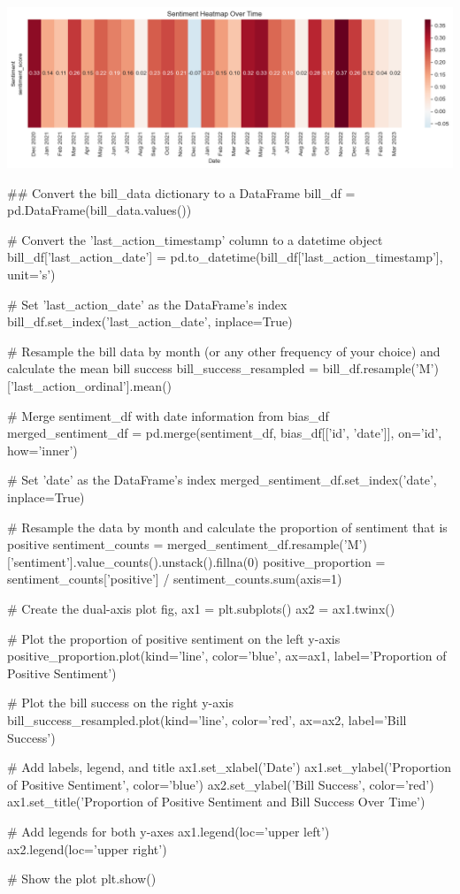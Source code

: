 \includegraphics[width=\textwidth]{./figs/fig_8.png}
\begin{pyin}
\## Convert the bill_data dictionary to a DataFrame
bill_df = pd.DataFrame(bill_data.values())

# Convert the 'last_action_timestamp' column to a datetime object
bill_df['last_action_date'] = pd.to_datetime(bill_df['last_action_timestamp'], unit='s')

# Set 'last_action_date' as the DataFrame's index
bill_df.set_index('last_action_date', inplace=True)

# Resample the bill data by month (or any other frequency of your choice) and calculate the mean bill success
bill_success_resampled = bill_df.resample('M')['last_action_ordinal'].mean()

# Merge sentiment_df with date information from bias_df
merged_sentiment_df = pd.merge(sentiment_df, bias_df[['id', 'date']], on='id', how='inner')

# Set 'date' as the DataFrame's index
merged_sentiment_df.set_index('date', inplace=True)

# Resample the data by month and calculate the proportion of sentiment that is positive
sentiment_counts = merged_sentiment_df.resample('M')['sentiment'].value_counts().unstack().fillna(0)
positive_proportion = sentiment_counts['positive'] / sentiment_counts.sum(axis=1)

# Create the dual-axis plot
fig, ax1 = plt.subplots()
ax2 = ax1.twinx()

# Plot the proportion of positive sentiment on the left y-axis
positive_proportion.plot(kind='line', color='blue', ax=ax1, label='Proportion of Positive Sentiment')

# Plot the bill success on the right y-axis
bill_success_resampled.plot(kind='line', color='red', ax=ax2, label='Bill Success')

# Add labels, legend, and title
ax1.set_xlabel('Date')
ax1.set_ylabel('Proportion of Positive Sentiment', color='blue')
ax2.set_ylabel('Bill Success', color='red')
ax1.set_title('Proportion of Positive Sentiment and Bill Success Over Time')

# Add legends for both y-axes
ax1.legend(loc='upper left')
ax2.legend(loc='upper right')

# Show the plot
plt.show()

\end{pyin}

